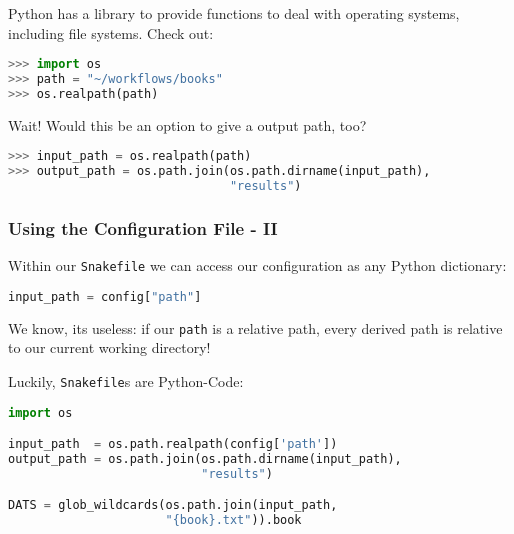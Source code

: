 \begin{frame}[fragile]
  \frametitle{}
  Python has a library to provide functions to deal with operating systems, including file systems. Check out:
  \begin{lstlisting}[language=Python,style=Python]
>>> import os
>>> path = "~/workflows/books"
>>> os.realpath(path)
  \end{lstlisting}
  \pause
  Wait! Would this be an option to give a output path, too?
  \begin{lstlisting}[language=Python,style=Python,basicstyle=\footnotesize]
>>> input_path = os.realpath(path)
>>> output_path = os.path.join(os.path.dirname(input_path),
                               "results")
  \end{lstlisting}
  \vfill
\end{frame}


\begingroup
{}
\begin{frame}[fragile]
  \frametitle{Using the Configuration File - II}
  Within our \texttt{Snakefile} we can access our configuration as any Python dictionary:
  \begin{lstlisting}[language=Python,style=Python]
input_path = config["path"]
  \end{lstlisting}
  \begin{hint}
  	We know, its useless: if our \texttt{path} is a relative path, every derived path is relative to our current working directory!
  \end{hint}
  \pause
  Luckily, \texttt{Snakefile}s are Python-Code:
  \begin{lstlisting}[language=Python,style=Python]
import os

input_path  = os.path.realpath(config['path'])
output_path = os.path.join(os.path.dirname(input_path),
                           "results")

DATS = glob_wildcards(os.path.join(input_path, 
                      "{book}.txt")).book
  \end{lstlisting}
\end{frame}
\endgroup

